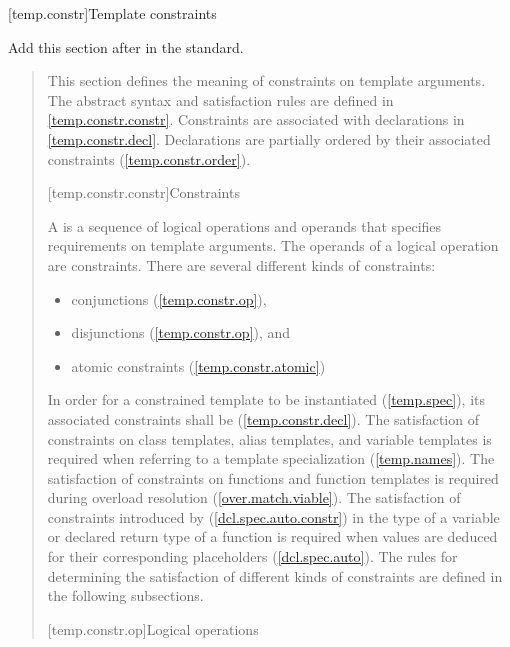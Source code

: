 
\setcounter{section}{9}
[temp.constr]{Template constraints}

Add this section after  in the \Cpp standard.

\begin{quote}
\begin{addedblock}

\pnum
\enternote
This section defines the meaning of constraints on template arguments.
% 
The abstract syntax and satisfaction rules are defined
in \ref{temp.constr.constr}. 
% 
Constraints are associated with declarations in \ref{temp.constr.decl}.
% 
Declarations are partially ordered by their associated constraints 
(\ref{temp.constr.order}).
\exitnote


[temp.constr.constr]{Constraints}

\pnum
A  is a sequence of logical operations and 
operands that specifies requirements on template arguments.
\enternote The operands of a logical operation are constraints. \exitnote
% 
There are several different kinds of constraints:
\begin{itemize}
\item conjunctions (\ref{temp.constr.op}),
\item disjunctions (\ref{temp.constr.op}), and
\item atomic constraints (\ref{temp.constr.atomic})
\end{itemize}

\pnum
In order for a constrained template to be instantiated (\ref{temp.spec}), its 
associated constraints shall be  (\ref{temp.constr.decl}).
% 
\enternote
The satisfaction of constraints on class templates, alias templates, 
and variable templates is required when referring to a template specialization 
(\ref{temp.names}). The satisfaction of constraints on functions and
function templates is required during overload resolution 
(\ref{over.match.viable}). The satisfaction of constraints introduced by
 (\ref{dcl.spec.auto.constr})
in the type of a variable or declared return type of a function is 
required when values are deduced for their corresponding placeholders 
(\ref{dcl.spec.auto}).
\exitnote
% 
The rules for determining the satisfaction of different kinds of 
constraints are defined in the following subsections.


[temp.constr.op]{Logical operations}


\end{addedblock}
\end{quote}
